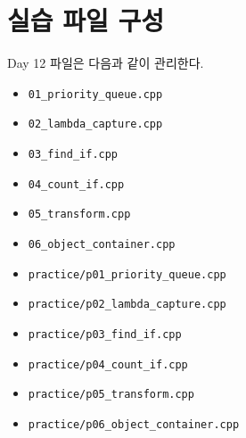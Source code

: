 \documentclass[11pt,a4paper]{article}
\begin{document}
\section{실습 파일 구성}
\begin{practicebox}
Day 12 파일은 다음과 같이 관리한다.
\begin{itemize}[leftmargin=1.5em]
    \item \texttt{01\_priority\_queue.cpp}
    \item \texttt{02\_lambda\_capture.cpp}
    \item \texttt{03\_find\_if.cpp}
    \item \texttt{04\_count\_if.cpp}
    \item \texttt{05\_transform.cpp}
    \item \texttt{06\_object\_container.cpp}
    \item \texttt{practice/p01\_priority\_queue.cpp}
    \item \texttt{practice/p02\_lambda\_capture.cpp}
    \item \texttt{practice/p03\_find\_if.cpp}
    \item \texttt{practice/p04\_count\_if.cpp}
    \item \texttt{practice/p05\_transform.cpp}
    \item \texttt{practice/p06\_object\_container.cpp}
\end{itemize}
\end{practicebox}
\end{document}
